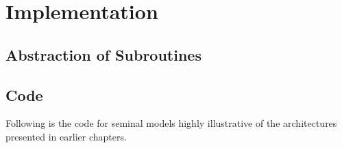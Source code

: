 
\chapter{Implementation} %

\label{implement} %



\section{Abstraction of Subroutines}

\section{Code}
Following is the code for seminal models highly illustrative of the architectures presented in earlier chapters.

